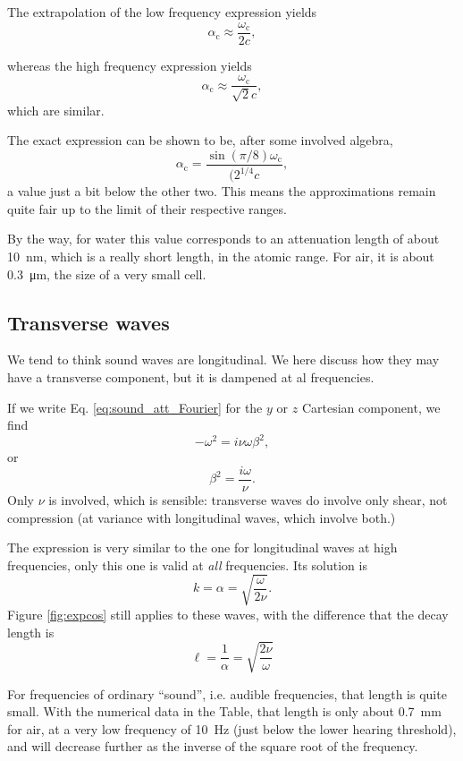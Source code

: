 The extrapolation of the low frequency expression yields
\[
\alpha_\mathrm{c}\approx \frac{\omega_\mathrm{c}}{2 c} ,
\]

whereas the high frequency expression yields
\[
\alpha_\mathrm{c}\approx \frac{\omega_\mathrm{c}}{\sqrt{2} c} ,
\]
which are similar.

The exact expression can be shown to be, after some involved algebra,
\[
\alpha_\mathrm{c} =\frac{ \sin(\pi/8) \omega_\mathrm{c} }{ (2^{1/4} c } ,
\]
a value just a bit below the other two. This means the approximations
remain quite fair up to the limit of their respective ranges.

By the way, for water this value corresponds to an attenuation length
of about \SI{10}{\nano\meter}, which is a really short length, in the
atomic range. For air, it is about \SI{0.3}{\micro\meter}, the size of
a very small cell.

\subsection{Transverse waves}

We tend to think sound waves are longitudinal. We here discuss how
they may have a transverse component, but it is dampened at al
frequencies.

If we write Eq. \ref{eq:sound_att_Fourier} for the $y$ or $z$
Cartesian component, we find
\[
-\omega^2 =  i \nu \omega \beta^2 ,
\]
or
\[
\beta^2 = \frac{i \omega}{\nu}.
\]
Only $\nu$ is involved, which is sensible: transverse waves do involve
only shear, not compression (at variance with longitudinal waves,
which involve both.)

The expression is very similar to the one for longitudinal waves at
high frequencies, only this one is valid at \emph{all} frequencies.
Its solution is
\[
k = \alpha = \sqrt{ \frac{\omega}{ 2 \nu}}.
\]
Figure \ref{fig:expcos} still applies to these waves, with the
difference that the decay length is
\[
\ell= \frac{1}{\alpha}=\sqrt{\frac{ 2 \nu}{\omega}}
\]

For frequencies of ordinary ``sound'', i.e. audible frequencies, that
length is quite small. With the numerical data in the Table, that
length is only about \SI{0.7}{\milli\meter} for air, at a very low
frequency of \SI{10}{\hertz} (just below the lower hearing threshold),
and will decrease further as the inverse of the square root of the
frequency.



